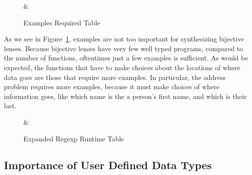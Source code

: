 \begin{figure}
\centering

%
{\Test{} & \ExamplesRequired{}}%

\caption{Examples Required Table}
\label{fig:examples-required-table}
\end{figure}

As we see in Figure~\ref{fig:examples-required-table}, examples are not too
important for synthesizing bijective lenses.
Because bijective lenses have very few well typed programs, compared to the
number of functions, oftentimes just a few examples is sufficient.
As would be expected, the functions that have to make choices about the
locations of where data goes are those that require more examples.
In particular, the address problem requires more examples, because it must make
choices of where information goes, like which name is the a person's first name,
and which is their last.

\begin{figure}
\centering

%
{\Test{} & \ForceExpandTime{}}%

\caption{Expanded Regexp Runtime Table}
\label{fig:expanded-time-table}
\end{figure}
\subsection{Importance of User Defined Data Types}




